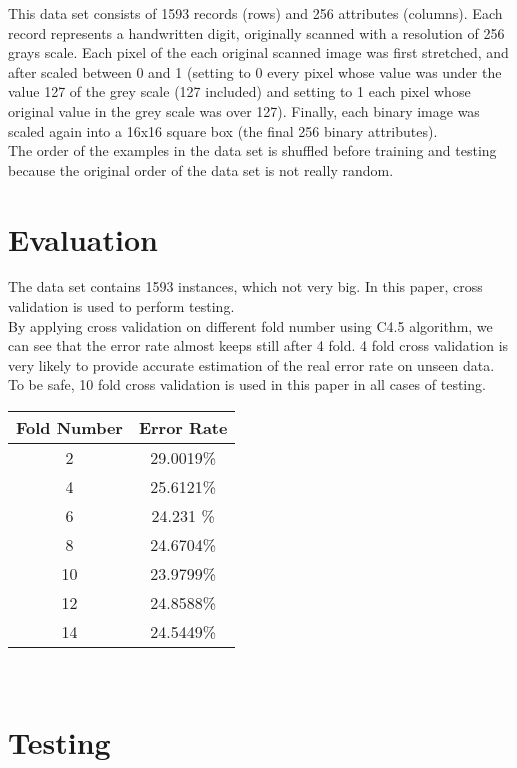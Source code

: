 \documentclass[a4paper,11pt]{article}
\begin{document}
This data set consists of 1593 records (rows) and 256 attributes (columns).
Each record represents a handwritten digit, originally scanned with a resolution of 256 grays scale.
Each pixel of the each original scanned image was first stretched, and after scaled between 0 and 1 (setting to 0 every pixel whose value was under the value 127 of the grey scale (127 included) and setting to 1 each pixel whose original value in the grey scale was over 127).
Finally, each binary image was scaled again into a 16x16 square box (the final 256 binary attributes).\\
The order of the examples in the data set is shuffled before training and testing because the original order of the data set is not really random.
\section{Evaluation}

The data set contains 1593 instances, which not very big. In this paper, cross validation is used to perform testing. \\
By applying cross validation on different fold number using C4.5 algorithm, we can see that the error rate almost keeps still after 4 fold. 4 fold cross validation is very likely to provide accurate estimation of the real error rate on unseen data. To be safe, 10 fold cross validation is used in this paper in all cases of testing.

\vspace{0.5cm}
\begin{tabular}{c c}
Fold Number & Error Rate\\
\hline \hline
2  &29.0019\%\\
4  &25.6121\%\\
6  &24.231 \%\\
8  & 24.6704\%\\
10 & 23.9799\%\\
12 & 24.8588\%\\
14 & 24.5449\%\\
\end{tabular}
\vspace{0.5cm}\\
\section{Testing}
\end{document}
